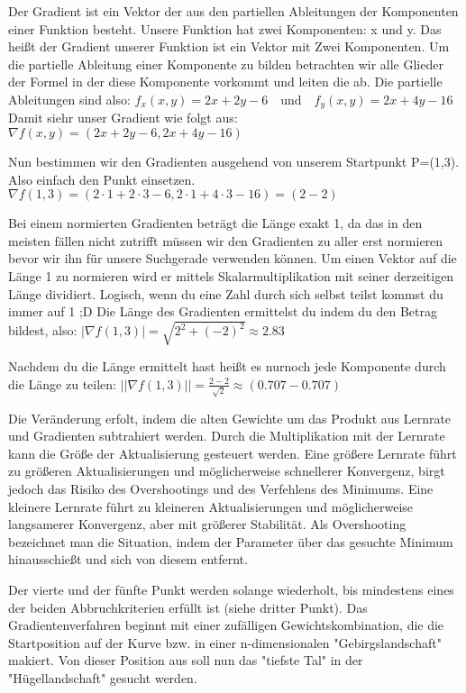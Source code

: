   Der Gradient ist ein Vektor der aus den partiellen Ableitungen der Komponenten einer Funktion besteht. Unsere Funktion hat zwei Komponenten: x und y.
  Das heißt der Gradient unserer Funktion ist ein Vektor mit Zwei Komponenten.
  Um die partielle Ableitung einer Komponente zu bilden betrachten wir alle Glieder der Formel in der diese Komponente vorkommt und leiten die ab. Die partielle Ableitungen sind also:
  $f_x(x, y) = 2x + 2y - 6 \quad \text{und} \quad f_y(x, y) = 2x + 4y - 16$
  Damit siehr unser Gradient wie folgt aus:
  $\nabla f(x, y) = (2x + 2y - 6, 2x + 4y - 16)$

  Nun bestimmen wir den Gradienten ausgehend von unserem Startpunkt P=(1,3). Also einfach den Punkt einsetzen. 
  $\nabla f(1,3) = (2 \cdot 1 + 2 \cdot 3 - 6, 2 \cdot 1 + 4 \cdot 3 - 16) = (2 - 2)$

  Bei einem normierten Gradienten beträgt die Länge exakt 1, da das in den meisten fällen nicht zutrifft müssen wir den Gradienten zu aller erst normieren bevor wir ihn für unsere Suchgerade verwenden können. Um einen Vektor auf die Länge 1 zu normieren wird er mittels Skalarmultiplikation mit seiner derzeitigen Länge dividiert. Logisch, wenn du eine Zahl durch sich selbst teilst kommst du immer auf 1 ;D
  Die Länge des Gradienten ermittelst du indem du den Betrag bildest, also:
  $|\nabla f(1,3)| = \sqrt{2^2 + (-2)^2} \approx 2.83$

  Nachdem du die Länge ermittelt hast heißt es nurnoch jede Komponente durch die Länge zu teilen:
  $||\nabla f(1,3)|| = \frac{2 - 2}{\sqrt{2}} \approx (0.707 - 0.707)$

  Die Veränderung erfolt, indem die alten Gewichte um das Produkt aus Lernrate und Gradienten subtrahiert werden. Durch die Multiplikation mit der Lernrate kann die Größe der Aktualisierung gesteuert werden.
  Eine größere Lernrate führt zu größeren Aktualisierungen und möglicherweise schnellerer Konvergenz, birgt jedoch das Risiko des Overshootings und des Verfehlens des Minimums.
  Eine kleinere Lernrate führt zu kleineren Aktualisierungen und möglicherweise langsamerer Konvergenz, aber mit größerer Stabilität. Als Overshooting bezeichnet man die Situation, indem der 
  Parameter über das gesuchte Minimum hinausschießt und sich von diesem entfernt.

  Der vierte und der fünfte Punkt werden solange wiederholt, bis mindestens eines der beiden Abbruchkriterien erfüllt ist (siehe dritter Punkt).
  Das Gradientenverfahren beginnt mit einer zufälligen Gewichtskombination, die die Startposition auf der Kurve bzw. in einer n-dimensionalen "Gebirgslandschaft" makiert.
  Von dieser Position aus soll nun das "tiefste Tal" in der "Hügellandschaft" gesucht werden.\cite{GR10}
  
